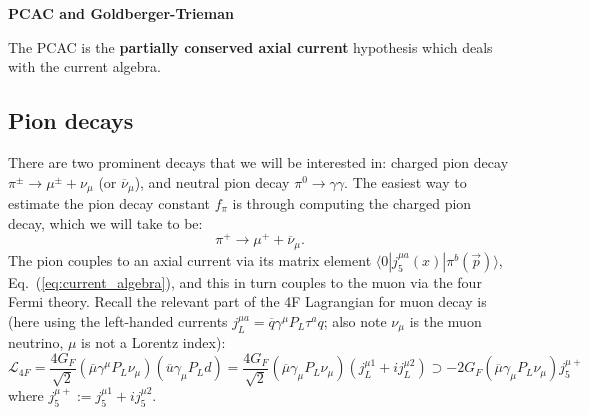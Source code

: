 \documentclass[11pt, oneside]{article}   	%
\theoremstyle{definition}
\numberwithin{equation}{subsection}		%
\newenvironment{answer}{\begin{center}\begin{answerbox}}{\end{answerbox}\end{center}}
\begin{document}
\begin{answer}
\textbf{PCAC and Goldberger-Trieman}

\begin{flushleft} \setlength{\parindent}{2em}
The PCAC is the \textbf{partially conserved axial current} hypothesis which deals with the current algebra. 
\end{flushleft}
\end{answer}

\subsection{Pion decays}
There are two prominent decays that we will be interested in: charged pion 
decay $\pi^\pm\rightarrow\mu^\pm + \nu_\mu$ (or $\overline\nu_\mu$), and neutral pion decay $\pi^0\rightarrow \gamma\gamma$. The 
easiest way to estimate the pion decay constant $f_\pi$ is through computing the charged pion decay, which we will take to be:
\begin{equation}
	\pi^+\rightarrow\mu^+ + \overline\nu_\mu.
\end{equation}
The pion couples to an axial current via its matrix element $\langle 0 | j_5^{\mu a}(x) | \pi^b(\vec p)\rangle$, Eq.~(\ref{eq:current_algebra}), and this in turn couples to the 
muon via the four Fermi theory. Recall the relevant part of the 4F Lagrangian for muon decay is (here using the left-handed currents $j_L^{\mu a} = \overline q \gamma^\mu P_L \tau^a 
q$; also note $\nu_\mu$ is the muon neutrino, $\mu$ is not a Lorentz index):
\begin{equation}
	\mathcal L_{4F} = \frac{4 G_F}{\sqrt 2} (\overline\mu\gamma^\mu P_L \nu_\mu)(\overline u \gamma_\mu P_L d) 
	= \frac{4 G_F}{\sqrt 2} (\overline\mu\gamma_\mu P_L\nu_\mu) (j_L^{\mu 1} + i j_L^{\mu 2}) \supset - 2 G_F(\overline\mu 
	\gamma_\mu P_L \nu_\mu)j_5^{\mu +}~
	\label{eq:four_fermi_muon_pion}
\end{equation}
where $j_5^{\mu +} := j_5^{\mu 1} + i j_5^{\mu 2}$.
\end{document}
